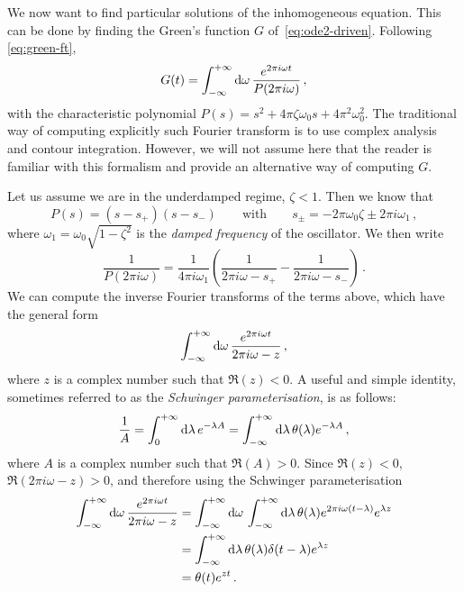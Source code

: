 We now want to find particular solutions of the inhomogeneous equation. This can be
done by finding the Green's function $G$ of~\cref{eq:ode2-driven}. Following
\cref{eq:green-ft},
\begin{equation}
  G(t)=\int_{-\infty}^{+\infty}\mathrm{d}{\omega}\,\frac{e^{2\pi i\omega t}}{P(2\pi i\omega)}\,,
\end{equation}
with the characteristic polynomial $P(s)=s^2+4\pi\zeta\omega_0s+4\pi^2\omega_0^2$. The
traditional way of computing explicitly such Fourier transform is to use complex analysis
and contour integration. However, we will not assume here that the reader is familiar with
this formalism and provide an alternative way of computing $G$.

Let us assume we are in the underdamped regime, \ie $\zeta<1$. Then we know that
\begin{equation}
  P(s)=(s-s_+)(s-s_-)\qquad\text{with}\qquad
  s_\pm=-2\pi\omega_0\zeta\pm 2\pi i\omega_1\,,
\end{equation}
where $\omega_1=\omega_0\sqrt{1-\zeta^2}$ is the \emph{damped frequency} of the
oscillator. We then write
\begin{equation}
  \frac{1}{P(2\pi i\omega)}=\frac{1}{4\pi i\omega_1}\left(\frac{1}{2\pi i\omega-s_+}
  -\frac{1}{2\pi i\omega-s_-}\right)\,.
  \label{eq:p-part-frac}
\end{equation}
We can compute the inverse Fourier transforms of the terms above, which have the general
form
\begin{equation}
  \int_{-\infty}^{+\infty}\mathrm{d}{\omega}\,\frac{e^{2\pi i\omega t}}{2\pi i \omega-z}\,,
\end{equation}
where $z$ is a complex number such that $\Re(z)<0$. A useful and simple identity,
sometimes referred to as the \emph{Schwinger parameterisation}, is as follows:
\begin{equation}
  \frac{1}{A}=\int_0^{+\infty}\mathrm{d}\lambda\,e^{-\lambda A}
  =\int_{-\infty}^{+\infty}\mathrm{d}{\lambda}\,\theta(\lambda)e^{-\lambda A}\,,
\end{equation}
where $A$ is a complex number such that $\Re(A)>0$. Since $\Re(z)<0$, $\Re(2\pi i
\omega-z)>0$, and therefore using the Schwinger parameterisation
\begin{align}
  \int_{-\infty}^{+\infty}\mathrm{d}{\omega}\,\frac{e^{2\pi i\omega t}}{2\pi i \omega-z}&=
  \int_{-\infty}^{+\infty}\mathrm{d}{\omega}\,\int_{-\infty}^{+\infty}\mathrm{d}{\lambda}\,\theta(\lambda)
  e^{2\pi i\omega(t-\lambda)}e^{\lambda z}\notag\\
  &=\int_{-\infty}^{+\infty}\mathrm{d}{\lambda}\,\theta(\lambda)\delta(t-\lambda)e^{\lambda z}\notag\\
  &=\theta(t)e^{zt}\,.
\end{align}
